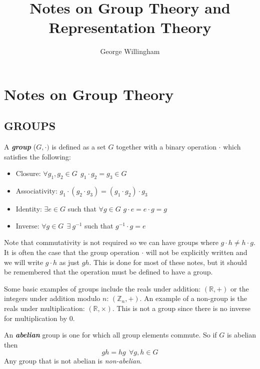 \documentclass[9 pt]{report}
\title{Notes on Group Theory and Representation Theory}
\author{George Willingham}
\begin{document}
	
	
\maketitle

\tableofcontents
\newpage


\chapter*{Notes on Group Theory}

{\centering
	\section*{GROUPS}}
\begin{tcolorbox}
	A \textbf{\textit{group}} ($G, \cdot)$ is defined as a set $G$ together with a binary operation $\cdot$ which satisfies the following:
	\begin{itemize}
		\item Closure: $\forall g_1, g_2 \in G \:\: g_1 \cdot g_2 = g_3 \in G $
		\item Associativity: $g_1\cdot  (g_2 \cdot g_3) = (g_1 \cdot g_2)\cdot g_3 $
		\item Identity: $\exists e\in G $ such that $\forall g\in G$ $g\cdot e=e\cdot g=g $
		\item Inverse: $\forall g\in G \:\:\exists \: g^{-1}$ such that $g^{-1}\cdot  g=e $
	\end{itemize}
\end{tcolorbox}
Note that commutativity is not required so we can have groups where $g\cdot h\neq h\cdot g$. It is often the case that the group operation $\cdot$ will not be explicitly written and we will write $g\cdot h$ as just $gh$. This is done for most of these notes, but it should be remembered that the operation must be defined to have a group. 

Some basic examples of groups include the reals under addition: $(\mathbb{R}, +)$ or the integers under addition modulo $n$: $(\mathbb{Z}_n , +)$. An example of a non-group is the reals under multiplication: $(\mathbb{R}, \times)$. This is not a group since there is no inverse for multiplication by 0.

\begin{tcolorbox}
	An \textbf{\emph{abelian}} group is one for which all group elements commute. So if $G$ is abelian then
	$$ gh = hg \:\:\forall g,h\in G $$ 
	Any group that is not abelian is \emph{non-abelian}.
\end{tcolorbox}
\end{document}
